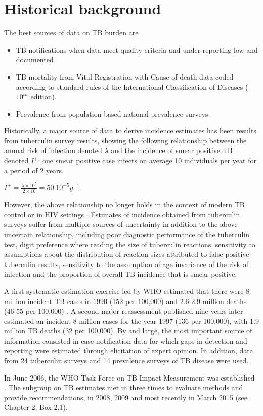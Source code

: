 \section{Historical background}

The best sources of data on TB burden are 
\begin{itemize}
\item TB notifications when data meet quality criteria and under-reporting low and documented
\item TB mortality from Vital Registration with Cause of death data coded according to standard rules of the International Classification of Diseases ($10^{th}$ edition).
\item Prevalence from population-based national prevalence surveys
\end{itemize}

Historically, a major source of data to derive incidence estimates has been results from tuberculin survey results\cite{Styblo1985}, showing the following relationship between the annual risk of infection denoted $\lambda$ and the incidence of smear positive TB denoted $I^+$: one smear positive case infects on average 10 individuals per year for a period of 2 years.

$I^+ = \frac{\lambda \times 10^5}{2 \times 10} = 50.10^{-5} y^{-1}$

However, the above relationship no longer holds in the context of modern TB control or in HIV settings \cite{18235886}. Estimates of incidence obtained from tuberculin surveys suffer from multiple sources of uncertainty in addition to the above uncertain relationship, including poor diagnostic performance of the tuberculin test, digit preference where reading the size of tuberculin reactions, sensitivity to assumptions about the distribution of reaction sizes attributed to false positive tuberculin results, sensitivity to the assumption of age invariance of the risk of infection and the proportion of overall TB incidence that is smear positive. 

A first systematic estimation exercise led by WHO estimated that there were 8 million incident TB cases in 1990 (152 per 100,000) and 2.6-2.9 million deaths (46-55 per 100,000) \cite{1600578}. A second major reassessment published nine years later \cite{10517722} estimated an incident 8 million cases for the year 1997 (136 per 100,000), with 1.9 million TB deaths (32 per 100,000). By and large, the most important source of information consisted in case notification data for which gaps in detection and reporting were estimated through elicitation of expert opinion. In addition, data from 24 tuberculin surveys and 14 prevalence surveys of TB disease were used.

In June 2006, the WHO Task Force on TB Impact Measurement was established \cite{18201929}. The subgroup on TB estimates met in three times to evaluate methods and provide recommendations, in 2008, 2009 and most recently in March 2015 (see Chapter 2, Box 2.1).



  
  
  
  
  
  
  
  
  
  
  